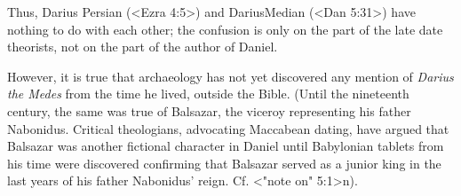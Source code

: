 %
%
%

Thus, Darius Persian (<Ezra 4:5>) and DariusMedian (<Dan 5:31>) have nothing to do with each other; the confusion is only on the part of the late date theorists, not on the part of the author of Daniel.

However, it is true that archaeology has not yet discovered any mention of {\it Darius the Medes} from the time he lived, outside the Bible.
(Until the nineteenth century, the same was true of Balsazar, the viceroy representing his father Nabonidus. Critical theologians, advocating Maccabean dating, have argued that
Balsazar was another fictional character in Daniel until Babylonian tablets from his time were discovered confirming that Balsazar served as a junior king in the last years of his father Nabonidus' reign. Cf. <"note on" 5:1>n).

